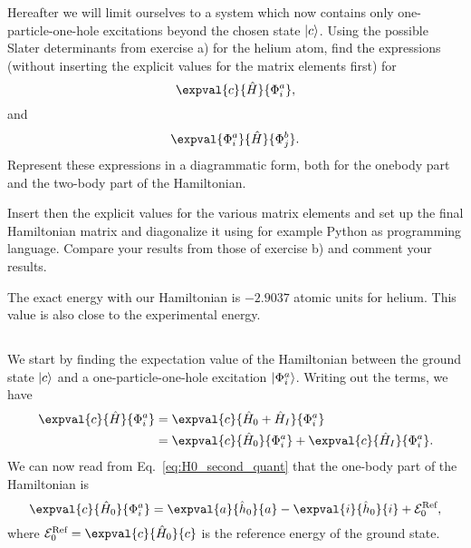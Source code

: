 Hereafter we will limit ourselves to a system which now contains only one-particle-one-hole excitations beyond the chosen state $\lvert c\rangle$.
Using the possible Slater determinants from exercise a) for the helium atom, find the expressions (without inserting the explicit values for the matrix elements first) for %
\begin{equation*}
    \expval{c}{\hat{H}}{\Phi_i^a},
\end{equation*}
and
\begin{equation*}
    \expval{\Phi_i^a}{\hat{H}}{\Phi_j^b}.
\end{equation*}
Represent these expressions in a diagrammatic form, both for the onebody part and the two-body part of the Hamiltonian.

Insert then the explicit values for the various matrix elements and set up the final Hamiltonian matrix and diagonalize it using for example Python as programming language.
Compare your results from those of exercise b) and comment your results. %

The exact energy with our Hamiltonian is $-2.9037$ atomic units for helium.
This value is also close to the experimental energy.

\subsection{}
We start by finding the expectation value of the Hamiltonian between the ground state $\lvert c\rangle$ and a one-particle-one-hole excitation $\lvert\Phi_i^a\rangle$.
Writing out the terms, we have
\begin{align*}
    \expval{c}{\hat{H}}{\Phi_i^a} &= \expval{c}{\hat{H}_0 + \hat{H}_I}{\Phi_i^a} \\
    &= \expval{c}{\hat{H}_0}{\Phi_i^a} + \expval{c}{\hat{H}_I}{\Phi_i^a}.
\end{align*}
We can now read from Eq.~\eqref{eq:H0_second_quant} that the one-body part of the Hamiltonian is
\begin{equation}\label{eq:1p1h-ground-onebody}
    \expval{c}{\hat{H}_0}{\Phi_i^a} = \expval{a}{\hat{h}_0}{a} - \expval{i}{\hat{h}_0}{i} + \mathcal{E}_0^{\text{Ref}},
\end{equation}
where $\mathcal{E}_0^{\text{Ref}} = \expval{c}{\hat{H}_0}{c}$ is the reference energy of the ground state.

